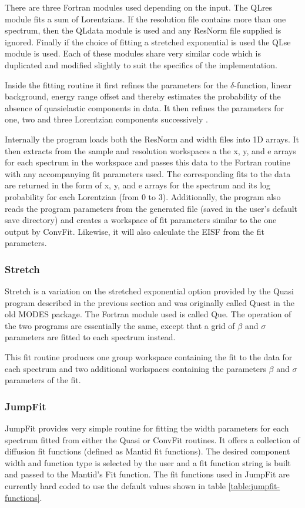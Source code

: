 \documentclass[paper=a4, fontsize=11pt]{scrartcl}	%
\numberwithin{equation}{section}															%
\numberwithin{figure}{section}																%
\numberwithin{table}{section}																%
\begin{document}
There are three Fortran modules used depending on the input. The QLres module fits a sum of Lorentzians. If the resolution file contains more than one spectrum, then the QLdata module is used and any ResNorm file supplied is ignored. Finally if the choice of fitting a stretched exponential is used the QLse module is used. Each of these modules share very similar code which is duplicated and modified slightly to suit the specifics of the implementation.

Inside the fitting routine it first refines the parameters for the $\delta$-function, linear background, energy range offset and thereby estimates the probability of the absence of quasielastic components in data. It then refines the parameters for one, two and three Lorentzian components successively \cite{dssivia1992}.

Internally the program loads both the ResNorm and width files into 1D arrays. It then extracts from the sample and resolution workspaces a the x, y, and e arrays for each spectrum in the workspace and passes this data to the Fortran routine with any accompanying fit parameters used. The corresponding fits to the data are returned in the form of x, y, and e arrays for the spectrum and its log probability for each Lorentzian (from 0 to 3). Additionally, the program also reads the program parameters from the generated file (saved in the user's default save directory) and creates a workspace of fit parameters similar to the one output by ConvFit. Likewise, it will also calculate the EISF from the fit parameters.

\subsubsection{Stretch}
\label{subsec:stretch}
Stretch is a variation on the stretched exponential option provided by the Quasi program described in the previous section and was originally called Quest in the old MODES package. The Fortran module used is called Que. The operation of the two programs are essentially the same, except that a grid of $\beta$ and $\sigma$ parameters are fitted to each spectrum instead.

This fit routine produces one group workspace containing the fit to the data for each spectrum and two additional workspaces containing the parameters $\beta$ and $\sigma$ parameters of the fit.

\subsubsection{JumpFit}
\label{subsec:jumpfit}
JumpFit provides very simple routine for fitting the width parameters for each spectrum fitted from either the Quasi or ConvFit routines. It offers a collection of diffusion fit functions (defined as Mantid fit functions). The desired component width and function type is selected by the user and a fit function string is built and passed to the Mantid's Fit function. The fit functions used in JumpFit are currently hard coded to use the default values shown in table \ref{table:jumpfit-functions}.
\end{document}
